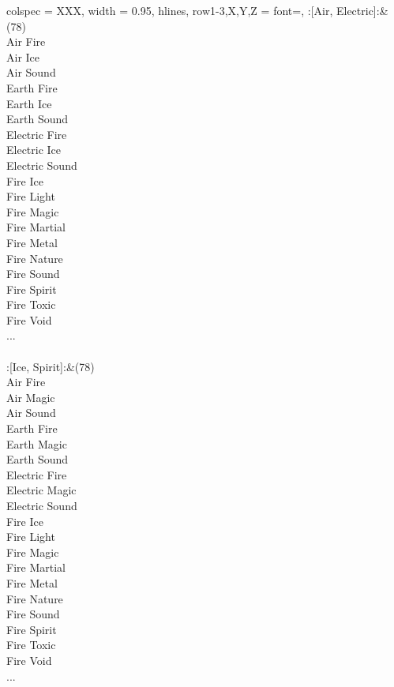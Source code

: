 \begin{longtblr}[
	caption = {2v2 Defending Weak},
	label = {2v2-Defending-Weak},
]{
	colspec = {XXX}, width = 0.95\linewidth,
	hlines,
	row{1-3,X,Y,Z} = {font=\bfseries},
}
	:[Air, Electric]:&{(78)\\
	Air Fire \\
	Air Ice \\
	Air Sound \\
	Earth Fire \\
	Earth Ice \\
	Earth Sound \\
	Electric Fire \\
	Electric Ice \\
	Electric Sound \\
	Fire Ice \\
	Fire Light \\
	Fire Magic \\
	Fire Martial \\
	Fire Metal \\
	Fire Nature \\
	Fire Sound \\
	Fire Spirit \\
	Fire Toxic \\
	Fire Void \\
	...\\
	}\\

	:[Ice, Spirit]:&{(78)\\
	Air Fire \\
	Air Magic \\
	Air Sound \\
	Earth Fire \\
	Earth Magic \\
	Earth Sound \\
	Electric Fire \\
	Electric Magic \\
	Electric Sound \\
	Fire Ice \\
	Fire Light \\
	Fire Magic \\
	Fire Martial \\
	Fire Metal \\
	Fire Nature \\
	Fire Sound \\
	Fire Spirit \\
	Fire Toxic \\
	Fire Void \\
	...\\
	}\\


\end{longtblr}

